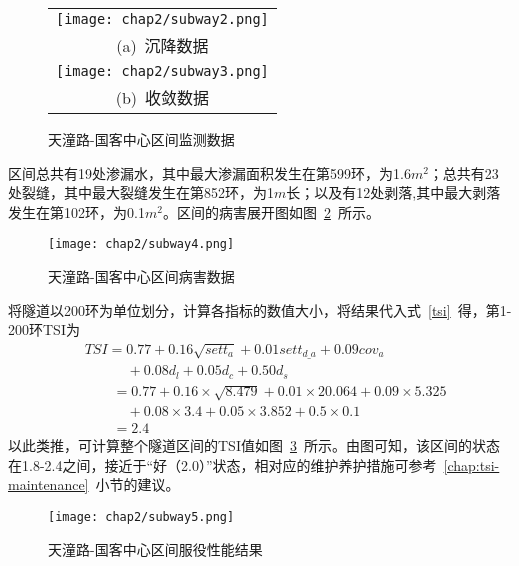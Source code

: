 \begin{figure}[htb!] 
    \centering 
    \begin{tabular}{c} 
        \texttt{[image: chap2/subway2.png]} \\ 
        (a)~沉降数据 \\
        \texttt{[image: chap2/subway3.png]} \\ 
        (b)~收敛数据 \\
    \end{tabular}
    \caption{天潼路-国客中心区间监测数据} 
    \label{fig:天潼路-国客中心区间监测数据} 
\end{figure}

区间总共有19处渗漏水，其中最大渗漏面积发生在第599环，为1.6$m^2$；总共有23处裂缝，其中最大裂缝发生在第852环，为1$m$长；以及有12处剥落,其中最大剥落发生在第102环，为0.1$m^2$。区间的病害展开图如图~\ref{fig:天潼路-国客中心区间病害数据}~所示。

\begin{figure}[htb!]
    \centering
    \texttt{[image: chap2/subway4.png]}
    \caption{天潼路-国客中心区间病害数据}
    \label{fig:天潼路-国客中心区间病害数据}
\end{figure}

将隧道以200环为单位划分，计算各指标的数值大小，将结果代入式~\ref{tsi}~得，第1-200环TSI为
\begin{align}
  & TSI=0.77+0.16\sqrt{{{sett}_{a}}}+0.01{{sett}_{d\_a}}+0.09{{cov}_{a}} \nonumber \\ 
 & \quad \quad \quad +0.08{{d}_{l}}+0.05{{d}_{c}}+0.50{{d}_{s}} \nonumber \\ 
 & \quad \quad =0.77+0.16\times \sqrt{8.479}+0.01\times 20.064+0.09\times 5.325 \nonumber \\ 
 & \quad \quad \quad +0.08\times 3.4+0.05\times 3.852+0.5\times 0.1 \nonumber \\ 
 & \quad \quad =2.4 \nonumber
\end{align}
以此类推，可计算整个隧道区间的TSI值如图~\ref{fig:天潼路-国客中心区间服役性能结果}~所示。由图可知，该区间的状态在1.8-2.4之间，接近于“好（2.0）”状态，相对应的维护养护措施可参考~\ref{chap:tsi-maintenance}~小节的建议。

\begin{figure}[htb!]
    \centering
    \texttt{[image: chap2/subway5.png]}
    \caption{天潼路-国客中心区间服役性能结果}
    \label{fig:天潼路-国客中心区间服役性能结果}
\end{figure}

